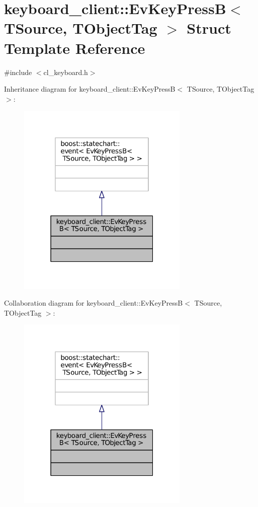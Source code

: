 \hypertarget{structkeyboard__client_1_1EvKeyPressB}{}\section{keyboard\+\_\+client\+:\+:Ev\+Key\+PressB$<$ T\+Source, T\+Object\+Tag $>$ Struct Template Reference}
\label{structkeyboard__client_1_1EvKeyPressB}


{\ttfamily \#include $<$cl\+\_\+keyboard.\+h$>$}



Inheritance diagram for keyboard\+\_\+client\+:\+:Ev\+Key\+PressB$<$ T\+Source, T\+Object\+Tag $>$\+:
\nopagebreak
\begin{figure}[H]
\begin{center}
\leavevmode
\includegraphics[width=232pt]{structkeyboard__client_1_1EvKeyPressB__inherit__graph}
\end{center}
\end{figure}


Collaboration diagram for keyboard\+\_\+client\+:\+:Ev\+Key\+PressB$<$ T\+Source, T\+Object\+Tag $>$\+:
\nopagebreak
\begin{figure}[H]
\begin{center}
\leavevmode
\includegraphics[width=232pt]{structkeyboard__client_1_1EvKeyPressB__coll__graph}
\end{center}
\end{figure}


